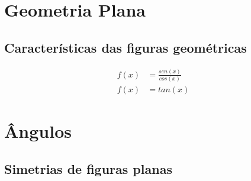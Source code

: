 \renewcommand{\sectionauthor}{Prof. Gustavo Ale}

\begin{multicols*}{2}
        
    \section*{Geometria Plana}
    \lipsum[1]

    \subsection*{Características das figuras geométricas}
    \lipsum[1-2]
    
   
    \begin{align}
        f(x) &= \frac{sen(x)}{cos(x)} \\[10pt]
        f(x) &= tan(x)
    \end{align}
    

    \newpage
    \section*{Ângulos}
    \lipsum[1]

    \subsection*{Simetrias de figuras planas}
    \lipsum[1-2]    
    
\end{multicols*}